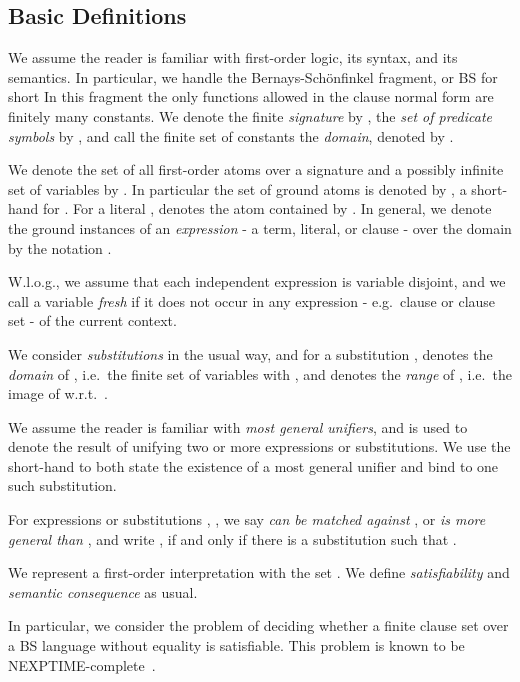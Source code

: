 \documentclass[a4paper]{article}
\newcommand{\mEPR}{Bernays-Sch\"onfinkel}
\newcommand{\mEPRs}{BS}
\begin{document}
\subsection{Basic Definitions}

We assume the reader is familiar with first-order logic, its syntax, and its semantics. 
In particular, we handle the {\mEPR} fragment, or {\mEPRs} for short
In this fragment the only functions allowed in the clause normal form are finitely many constants.
We denote the finite \emph{signature} by , the \emph{set of predicate symbols} by , 
and call the finite set of constants the \emph{domain}, denoted by .  



We denote the set of all first-order atoms over a signature  and a possibly infinite set of variables  by 
. 
In particular the set of ground atoms is denoted by , a short-hand for .
For a literal ,  denotes the atom contained by .
In general, we denote the ground instances of an \emph{expression} - a term, literal, or clause - 
 over the domain  by the notation . 

W.l.o.g., we assume that each independent expression is variable disjoint, and we call a variable \emph{fresh} if it does not occur in any expression - e.g.\ clause or clause set - of the current context. 

We consider \emph{substitutions} in the usual way, and for a substitution ,  denotes the \emph{domain} of , i.e.\
the finite set of variables with , and  denotes the \emph{range} of , i.e.\
the image of  w.r.t.\ .

We assume the reader is familiar with \emph{most general unifiers}, 
and  is used to denote the result of unifying two or more
expressions or substitutions.
We use the short-hand  to both state the existence of a most general unifier and bind 
 to one such substitution.



For expressions or substitutions , , we say  \emph{can be matched against} , or  \emph{is more general than} , and 
write , if and only if there is a substitution  such that . 

We represent a first-order interpretation  with the set .
We define \emph{satisfiability} and \emph{semantic consequence} as usual.

In particular, we consider the problem of deciding whether a finite clause set  over a {\mEPRs} language  without equality is satisfiable. 
This problem is known to be NEXPTIME-complete~\cite{Lewis80}.
\end{document}
